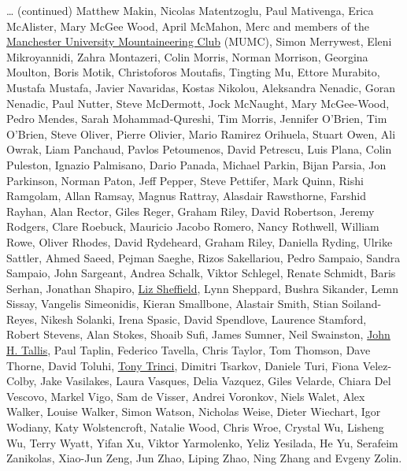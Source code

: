 \documentclass[
]{book}
\begin{document}
\ldots{} (continued) Matthew Makin, Nicolas Matentzoglu, Paul Mativenga, Erica McAlister, Mary McGee Wood, April McMahon, Merc and members of the \href{https://www.mumc.me.uk/wordpress}{Manchester University Mountaineering Club} (MUMC), Simon Merrywest, Eleni Mikroyannidi, Zahra Montazeri, Colin Morris, Norman Morrison, Georgina Moulton, Boris Motik, Christoforos Moutafis, Tingting Mu, Ettore Murabito, Mustafa Mustafa, Javier Navaridas, Kostas Nikolou, Aleksandra Nenadic, Goran Nenadic, Paul Nutter, Steve McDermott, Jock McNaught, Mary McGee-Wood, Pedro Mendes, Sarah Mohammad-Qureshi, Tim Morris, Jennifer O'Brien, Tim O'Brien, Steve Oliver, Pierre Olivier, Mario Ramirez Orihuela, Stuart Owen, Ali Owrak, Liam Panchaud, Pavlos Petoumenos, David Petrescu, Luis Plana, Colin Puleston, Ignazio Palmisano, Dario Panada, Michael Parkin, Bijan Parsia, Jon Parkinson, Norman Paton, Jeff Pepper, Steve Pettifer, Mark Quinn, Rishi Ramgolam, Allan Ramsay, Magnus Rattray, Alasdair Rawsthorne, Farshid Rayhan, Alan Rector, Giles Reger, Graham Riley, David Robertson, Jeremy Rodgers, Clare Roebuck, Mauricio Jacobo Romero, Nancy Rothwell, William Rowe, Oliver Rhodes, David Rydeheard, Graham Riley, Daniella Ryding, Ulrike Sattler, Ahmed Saeed, Pejman Saeghe, Rizos Sakellariou, Pedro Sampaio, Sandra Sampaio, John Sargeant, Andrea Schalk, Viktor Schlegel, Renate Schmidt, Baris Serhan, Jonathan Shapiro, \href{https://www.manchester.ac.uk/discover/governance/structure/board-governors/members/liz-sheffield/}{Liz Sheffield}, Lynn Sheppard, Bushra Sikander, Lemn Sissay, Vangelis Simeonidis, Kieran Smallbone, Alastair Smith, Stian Soiland-Reyes, Nikesh Solanki, Irena Spasic, David Spendlove, Laurence Stamford, Robert Stevens, Alan Stokes, Shoaib Sufi, James Sumner, Neil Swainston, \href{https://doi.org/10.1002/jqs.3390060408}{John H. Tallis}, Paul Taplin, Federico Tavella, Chris Taylor, Tom Thomson, Dave Thorne, David Toluhi, \href{https://www.theguardian.com/science/2020/nov/10/tony-trinci-obituary}{Tony Trinci}, Dimitri Tsarkov, Daniele Turi, Fiona Velez-Colby, Jake Vasilakes, Laura Vasques, Delia Vazquez, Giles Velarde, Chiara Del Vescovo, Markel Vigo, Sam de Visser, Andrei Voronkov, Niels Walet, Alex Walker, Louise Walker, Simon Watson, Nicholas Weise, Dieter Wiechart, Igor Wodiany, Katy Wolstencroft, Natalie Wood, Chris Wroe, Crystal Wu, Lisheng Wu, Terry Wyatt, Yifan Xu, Viktor Yarmolenko, Yeliz Yesilada, He Yu, Serafeim Zanikolas, Xiao-Jun Zeng, Jun Zhao, Liping Zhao, Ning Zhang and Evgeny Zolin.
\end{document}
